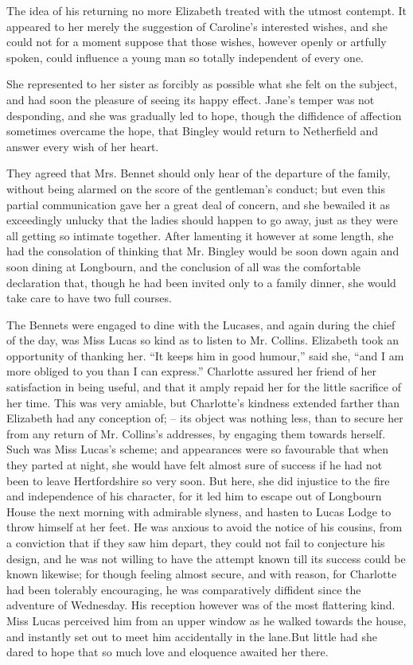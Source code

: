 The idea of his returning no more Elizabeth treated
with the utmost contempt. It appeared to her merely the
suggestion of Caroline’s interested wishes, and she could
not for a moment suppose that those wishes, however
openly or artfully spoken, could influence a young man so
totally independent of every one.

She represented to her sister as forcibly as possible
what she felt on the subject, and had soon the pleasure
of seeing its happy effect. Jane’s temper was not desponding,
and she was gradually led to hope, though the
diffidence of affection sometimes overcame the hope, that
Bingley would return to Netherfield and answer every wish
of her heart.

They agreed that Mrs. Bennet should only hear of the
departure of the family, without being alarmed on
the score of the gentleman’s conduct; but even this
partial communication gave her a great deal of concern,
and she bewailed it as exceedingly unlucky that the ladies
should happen to go away, just as they were all getting
so intimate together. After lamenting it however at some
length, she had the consolation of thinking that Mr.
Bingley would be soon down again and soon dining at
Longbourn, and the conclusion of all was the comfortable
declaration that, though he had been invited only to a
family dinner, she would take care to have two full
courses.


The Bennets were engaged to dine with the Lucases,
and again during the chief of the day, was Miss Lucas so
kind as to listen to Mr. Collins. Elizabeth took an opportunity
of thanking her. “It keeps him in good humour,”
said she, “and I am more obliged to you than I can
express.” Charlotte assured her friend of her satisfaction
in being useful, and that it amply repaid her for the little
sacrifice of her time. This was very amiable, but Charlotte’s
kindness extended farther than Elizabeth had any
conception of; -- its object was nothing less, than to secure
her from any return of Mr. Collins’s addresses, by engaging
them towards herself. Such was Miss Lucas’s scheme;
and appearances were so favourable that when they
parted at night, she would have felt almost sure of success
if he had not been to leave Hertfordshire so very soon.
But here, she did injustice to the fire and independence
of his character, for it led him to escape out of Longbourn
House the next morning with admirable slyness, and
hasten to Lucas Lodge to throw himself at her feet. He
was anxious to avoid the notice of his cousins, from
a conviction that if they saw him depart, they could not
fail to conjecture his design, and he was not willing to
have the attempt known till its success could be known
likewise; for though feeling almost secure, and with
reason, for Charlotte had been tolerably encouraging, he
was comparatively diffident since the adventure of Wednesday.
His reception however was of the most flattering
kind. Miss Lucas perceived him from an upper window
as he walked towards the house, and instantly set out
to meet him accidentally in the lane.But little had she
dared to hope that so much love and eloquence awaited
her there.

